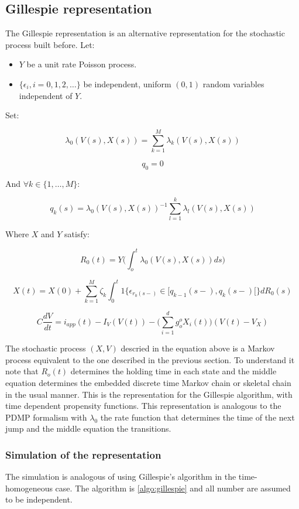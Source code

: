 \begin{abstract}
\end{abstract}




	\subsection{Gillespie representation}
	The Gillespie representation is an alternative representation for the stochastic process built before.
	Let:

	\begin{itemize}
		\item $Y$ be a unit rate Poisson process.
		\item $\{\epsilon_i, i = 0, 1, 2, \dots\}$ be independent, uniform $(0,1)$ random variables independent of $Y$.
	\end{itemize}

	Set:

	$$\lambda_0(V(s), X(s)) = \sum\limits_{k=1}^M\lambda_k(V(s), X(s))$$

	$$q_0 = 0$$

	And $\forall k\in\{1, \dots, M\}$:

	$$q_k(s) = \lambda_0(V(s), X(s))^{-1}\sum\limits_{l=1}^k\lambda_l(V(s), X(s))$$

	Where $X$ and $Y$ satisfy:

	$$R_0(t) = Y\biggl(\int_o^t\lambda_0(V(s), X(s))ds\biggr)$$

	$$X(t) = X(0) + \sum\limits_{k=1}^M\zeta_k\int_0^t1\{\epsilon_{r_0(s-)}\in[q_{k-1}(s-), q_k(s-)[\}dR_0(s)$$

	$$C\frac{dV}{dt} = i_{app}(t)-I_V(V(t)) - \biggl(\sum\limits_{i=1}^dg_o^oX_i(t)\biggr)(V(t)-V_X)$$

	The stochastic process $(X, V)$ descried in the equation above is a Markov process equivalent to the one described in the previous section.
	To understand it note that $R_o(t)$ determines the holding time in each state and the middle equation determines the embedded discrete time Markov chain or skeletal chain in the usual manner.
	This is the representation for the Gillespie algorithm, with time dependent propensity functions.
	This representation is analogous to the PDMP formalism with $\lambda_0$ the rate function that determines the time of the next jump and the middle equation the transitions.

		\subsubsection{Simulation of the representation}
		The simulation is analogous of using Gillespie's algorithm in the time-homogeneous case.
		The algorithm is \ref{algo:gillespie} and all number are assumed to be independent.

